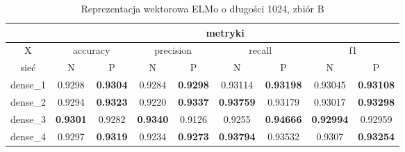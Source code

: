 \begin{table}[p] \centering
    \caption{Reprezentacja wektorowa ELMo o długości 1024, zbiór B}
    \label{tab:wyniki_elmo_B}
    \begin{tabular} {|c|c|c|c|c|c|c|c|c| }    \hline
                 & \multicolumn{8}{c|}{metryki}                                                                                                                                                                                                                                                            \\ \hline
        X        & \multicolumn{2}{c|}{accuracy}       & \multicolumn{2}{c|}{precision}      & \multicolumn{2}{c|}{recall} & \multicolumn{2}{c|}{f1}                                                                                                                                                       \\ \hline
        sieć     & N                                   & P                                   & N                           & P                                   & N                           & P                                    & N                                    & P                           \\ \hline
        dense\_1 & 0.9298                              & \textbf{0.9304}                     & 0.9284                      & \textbf{0.9298}                     & 0.93114                     & \textbf{0.93198}                     & 0.93045                              & \textbf{0.93108}            \\ \hline
        dense\_2 & 0.9294                              & \textbf{0.9323}                     & 0.9220                      & \textbf{0.9337}                     & \textbf{0.93759}            & 0.93179                              & 0.93017                              & \textbf{0.93298}            \\ \hline
        dense\_3 & \textbf{0.9301}                     & 0.9282                              & \textbf{0.9340}             & 0.9126                              & 0.9255                      & \textbf{0.94666}                     & \textbf{0.92994}                     & 0.92959                     \\ \hline
        dense\_4 & 0.9297                              & \textbf{0.9319}                     & 0.9234                      & \textbf{0.9273}                     & \textbf{0.93794}            & 0.93532                              & 0.9307                               & \textbf{0.93254}            \\ \hline

\end{tabular}
\end{table}

